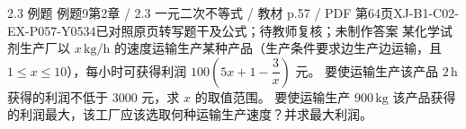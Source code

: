 \par\noindent\begin{minipage}{\linewidth}
\begin{bankitem}{2.3 例题 例题9}{第2章 / 2.3 一元二次不等式 / 教材 p.57 / PDF 第64页}{XJ-B1-C02-EX-P057-Y0534}{已对照原页转写题干及公式；待教师复核；未制作答案}
某化学试剂生产厂以 $x\,\mathrm{kg/h}$ 的速度运输生产某种产品（生产条件要求边生产边运输，且 $1\le x\le10$），每小时可获得利润 $100\left(5x+1-\dfrac3x\right)$ 元。
要使运输生产该产品 $2\,\mathrm h$ 获得的利润不低于 3000 元，求 $x$ 的取值范围。
要使运输生产 $900\,\mathrm{kg}$ 该产品获得的利润最大，该工厂应该选取何种运输生产速度？并求最大利润。
\end{bankitem}
\end{minipage}\par\medskip
